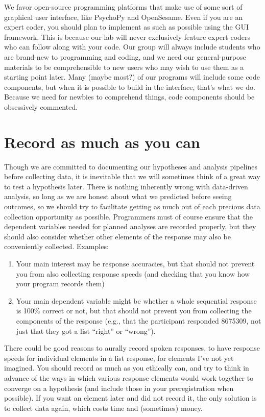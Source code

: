\documentclass[12pt,]{book}
\theoremstyle{definition}
\theoremstyle{definition}
\theoremstyle{definition}
\theoremstyle{remark}
\begin{document}
We favor open-source programming platforms that make use of some sort of
graphical user interface, like PsychoPy and OpenSesame. Even if you are
an expert coder, you should plan to implement as such as possible using
the GUI framework. This is because our lab will never exclusively
feature expert coders who can follow along with your code. Our group
will always include students who are brand-new to programming and
coding, and we need our general-purpose materials to be comprehensible
to new users who may wish to use them as a starting point later. Many
(maybe most?) of our programs will include some code components, but
when it is possible to build in the interface, that's what we do.
Because we need for newbies to comprehend things, code components should
be obsessively commented.

\section{Record as much as you can}\label{record-as-much-as-you-can}

Though we are committed to documenting our hypotheses and analysis
pipelines before collecting data, it is inevitable that we will
sometimes think of a great way to test a hypothesis later. There is
nothing inherently wrong with data-driven analysis, so long as we are
honest about what we predicted before seeing outcomes, so we should try
to facilitate getting as much out of each precious data collection
opportunity as possible. Programmers must of course ensure that the
dependent variables needed for planned analyses are recorded properly,
but they should also consider whether other elements of the response may
also be conveniently collected. Examples:

\begin{enumerate}
\def\labelenumi{\arabic{enumi}.}
\item
  Your main interest may be response accuracies, but that should not
  prevent you from also collecting response speeds (and checking that
  you know how your program records them)
\item
  Your main dependent variable might be whether a whole sequential
  response is 100\% correct or not, but that should not prevent you from
  collecting the components of the response (e.g., that the participant
  responded 8675309, not just that they got a list ``right'' or
  ``wrong'').
\end{enumerate}

There could be good reasons to aurally record spoken responses, to have
response speeds for individual elements in a list response, for elements
I've not yet imagined. You should record as much as you ethically can,
and try to think in advance of the ways in which various response
elements would work together to converge on a hypothesis (and include
those in your preregistration when possible). If you want an element
later and did not record it, the only solution is to collect data again,
which costs time and (sometimes) money.
\end{document}
